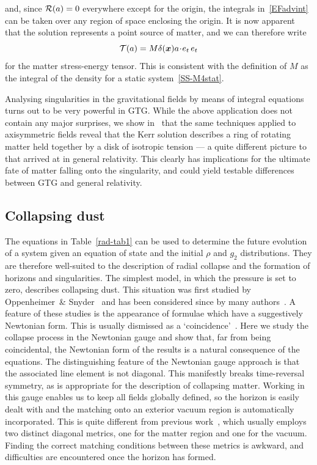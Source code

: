 \documentclass[a4paper]{article}
\numberwithin{equation}{section}
\newcommand{\dt}{\! \cdot \!}
\newcommand{\bx}{\mbox{\boldmath $x$}}
\newcommand{\clt}{{\mathcal{T}}}
\newcommand{\ric}{{\cal R}}
\begin{document}
%
and, since $\ric(a) = 0$ everywhere except for the origin, the
integrals in~\eqref{EFadvint} can be taken over any region of space
enclosing the origin.  It is now apparent that the solution represents
a point source of matter, and we can therefore write
%
\begin{equation}
\clt(a) = M \delta(\bx) a \dt e_t \, e_t
\label{swzste}
\end{equation} 
%
for the matter stress-energy tensor.  This is consistent with the
definition of $M$ as the integral of the density for a static
system~\eqref{SS-M4stat}.


Analysing singularities in the gravitational fields by means of
integral equations turns out to be very powerful in GTG.  While the
above application does not contain any major surprises, we show
in~\cite{DL04-KS} that the same techniques applied to axisymmetric
fields reveal that the Kerr solution describes a ring of rotating
matter held together by a disk of isotropic tension --- a quite
different picture to that arrived at in general relativity.  This
clearly has implications for the ultimate fate of matter falling onto
the singularity, and could yield testable differences between GTG and
general relativity.



\subsection{Collapsing dust}
\label{COLLDST}

The equations in Table~\ref{rad-tab1} can be used to determine the
future evolution of a system given an equation of state and the
initial $\rho$ and $g_2$ distributions.  They are therefore
well-suited to the description of radial collapse and the formation of
horizons and singularities.  The simplest model, in which the pressure
is set to zero, describes collapsing dust.  This situation was first
studied by Oppenheimer~\& Snyder~\cite{opp39} and has been considered
since by many authors~\cite{gaut95,mis64,mis-grav,pan92}.  A feature
of these studies is the appearance of formulae which have a
suggestively Newtonian form.  This is usually dismissed as a
`coincidence'~\cite[Section 32.4]{mis-grav}.  Here we study the
collapse process in the Newtonian gauge and show that, far from being
coincidental, the Newtonian form of the results is a natural
consequence of the equations.  The distinguishing feature of the
Newtonian gauge approach is that the associated line element is not
diagonal.  This manifestly breaks time-reversal symmetry, as is
appropriate for the description of collapsing matter.  Working in this
gauge enables us to keep all fields globally defined, so the horizon
is easily dealt with and the matching onto an exterior vacuum region
is automatically incorporated.  This is quite different from previous
work~\cite{opp39,mis64,mis-grav}, which usually employs two distinct
diagonal metrics, one for the matter region and one for the vacuum.
Finding the correct matching conditions between these metrics is
awkward, and difficulties are encountered once the horizon has formed.
\end{document}
